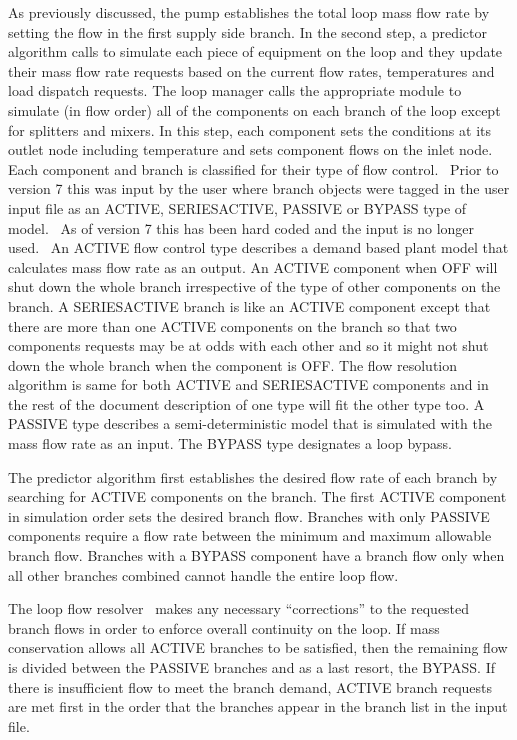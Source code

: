 As previously discussed, the pump establishes the total loop mass flow rate by setting the flow in the first supply side branch. In the second step, a predictor algorithm calls to simulate each piece of equipment on the loop and they update their mass flow rate requests based on the current flow rates, temperatures and load dispatch requests. The loop manager calls the appropriate module to simulate (in flow order) all of the components on each branch of the loop except for splitters and mixers. In this step, each component sets the conditions at its outlet node including temperature and sets component flows on the inlet node.~~ Each component and branch is classified for their type of flow control.~ Prior to version 7 this was input by the user where branch objects were tagged in the user input file as an ACTIVE, SERIESACTIVE, PASSIVE or BYPASS type of model.~ As of version 7 this has been hard coded and the input is no longer used.~ An ACTIVE flow control type describes a demand based plant model that calculates mass flow rate as an output. An ACTIVE component when OFF will shut down the whole branch irrespective of the type of other components on the branch. A SERIESACTIVE branch is like an ACTIVE component except that there are more than one ACTIVE components on the branch so that two components requests may be at odds with each other and so it might not shut down the whole branch when the component is OFF. The flow resolution algorithm is same for both ACTIVE and SERIESACTIVE components and in the rest of the document description of one type will fit the other type too. A PASSIVE type describes a semi-deterministic model that is simulated with the mass flow rate as an input. The BYPASS type designates a loop bypass.

The predictor algorithm first establishes the desired flow rate of each branch by searching for ACTIVE components on the branch. The first ACTIVE component in simulation order sets the desired branch flow. Branches with only PASSIVE components require a flow rate between the minimum and maximum allowable branch flow. Branches with a BYPASS component have a branch flow only when all other branches combined cannot handle the entire loop flow.

The loop flow resolver~ makes any necessary ``corrections'' to the requested branch flows in order to enforce overall continuity on the loop. If mass conservation allows all ACTIVE branches to be satisfied, then the remaining flow is divided between the PASSIVE branches and as a last resort, the BYPASS. If there is insufficient flow to meet the branch demand, ACTIVE branch requests are met first in the order that the branches appear in the branch list in the input file.

